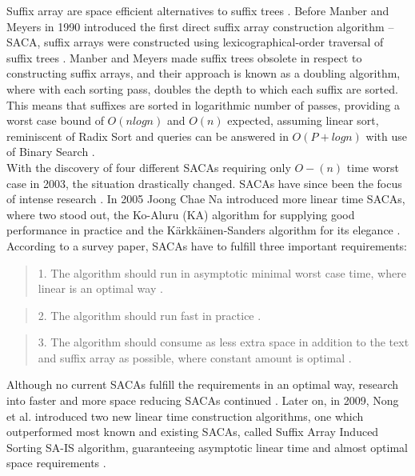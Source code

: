 \documentclass[12pt]{article} %
\begin{document}
Suffix array are space efficient alternatives to suffix trees \cite{gusfield,twoeffecient}. Before Manber and Meyers in 1990 introduced the first direct suffix array construction algorithm – SACA, suffix arrays were constructed using lexicographical-order traversal of suffix trees  \cite{gusfield,twoeffecient, performancesuffix, newapproach}. Manber and Meyers made suffix trees obsolete in respect to constructing suffix arrays, and their approach is known as a doubling algorithm, where with each sorting pass, doubles the depth to which each suffix are sorted. This means that suffixes are sorted in logarithmic number of passes, providing a worst case bound of $O(n log n)$ and $O(n)$ expected, assuming linear sort, reminiscent of Radix Sort \cite{performancesuffix} and queries can be answered in $O(P + log n)$ with use of Binary Search \cite{gusfield}.
\\
With the discovery of four different SACAs requiring only $O-(n)$ time worst case in 2003, the situation drastically changed. SACAs have since been the focus of intense research \cite{performancesuffix,newapproach}. In 2005 Joong Chae Na introduced more linear time SACAs, where two stood out, the Ko-Aluru (KA) algorithm for supplying good performance in practice and the Kärkkäinen-Sanders algorithm for its elegance \cite{newapproach}. 
\\
According to a survey paper, SACAs have to fulfill three important requirements: 
\begin{quote}
1. The algorithm should run in asymptotic minimal worst case time, where linear is an optimal way \cite{newapproach}. 
\end{quote}
\begin{quote}
2. The algorithm should run fast in practice \cite{newapproach}.
\end{quote}
\begin{quote}
3. The algorithm should consume as less extra space in addition to the text and suffix array as possible, where constant amount is optimal \cite{newapproach}.
\end{quote}
Although no current SACAs fulfill the requirements in an optimal way, research into faster and more space reducing SACAs continued \cite{newapproach}. Later on, in 2009, Nong et al. introduced two new linear time construction algorithms, one which outperformed most known and existing SACAs, called Suffix Array Induced Sorting SA-IS algorithm, guaranteeing asymptotic linear time and almost optimal space requirements \cite{newapproach}. 
\end{document}
